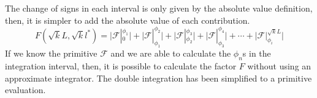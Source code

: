 The change of signs in each interval is only  given by the absolute value definition, then, it is simpler to add the absolute value of each contribution.
\begin{equation}
 F(\sqrt{k}L,\sqrt{k}l^*)= \bigr\vert\mathscr{F}|_0^{\phi_1}\bigr\vert + \bigr\vert\mathscr{F}|_{\phi_1}^{\phi_2}\bigr\vert +  \bigr\vert\mathscr{F}|_{\phi_2}^{\phi_3}\bigr\vert + \bigr\vert\mathscr{F}|_{\phi_3}^{\phi_4}\bigr\vert + \cdots +\bigr\vert\mathscr{F}|_{\phi_i}^{\sqrt{k}L}\bigr\vert
\end{equation}
If we know the primitive $\mathscr{F}$ and we are able to calculate the $\phi_n$s in the integration interval, then, it is possible to calculate the factor $F$ without using an approximate integrator. The double integration has been simplified to a primitive evaluation.
\clearpage

